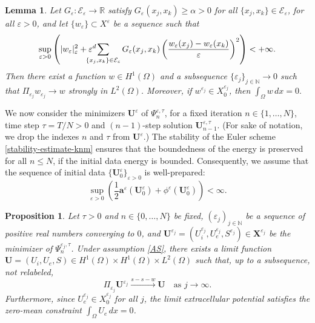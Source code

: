 \documentclass[a4paper,11pt]{article}
\newtheorem{lemma}[theorem]{Lemma}
\newtheorem{proposition}[theorem]{Proposition}
\theoremstyle{definition}
\numberwithin{equation}{section}
\newcommand{\e}{\varepsilon}
\newcommand{\R}{\mathbb{R}}
\begin{document}
\begin{lemma}
	\label{lemma:compactness}
	Let $G_\e:\mathcal E_\e \to \R$ satisfy $G_\e(x_j,x_k)\geq \alpha>0$ for all $\{x_j,x_k\}\in \mathcal E_\e$, for all $\e>0$, and let $\{w_\e\} \subset X^\e $ be a sequence such that
	\begin{equation}
		\label{eq:bounded_H1}
		\sup_{\e>0} \left( |w_\e|_\e^2 + \e^d\hspace{-0.5cm}\sum_{\{x_j,x_k\}\in \mathcal E_\e} G_\e(x_j,x_k) \left(\frac{w_\e(x_j)-w_\e(x_k)}{\e}\right)^2\right) < +\infty.
	\end{equation}
	Then there exist a function $w \in H^1(\Omega)$ and a subsequence $\{\e_j\}_{j \in \mathbb{N}} \to 0$ such that $\Pi_{\e_j} w_{\e_j} \to w$ strongly in $L^2(\Omega)$. Moreover, if $w^{\e_j} \in X_0^{\e_j}$, then
	\(
	\int_\Omega w \, dx = 0.
	\)
\end{lemma}




We now consider the minimizers $\mathbf{U}^\e$ of  $\Psi_n^{\e,\tau}$, for a fixed iteration $n \in \{1, \dots, N\}$, time step $\tau =T/N> 0$ and $(n-1)$-step solution $\mathbf{U}_{n-1}^{\e,\tau}$. (For sake of notation, we drop the indexes $n$ and $\tau$ from $\mathbf{U}^\e$.) 
The stability of the Euler scheme \eqref{stability-estimate-knm} ensures that the boundedness of the energy is preserved for all $n \le N$, if the initial data energy is bounded. Consequently, we assume that the sequence of initial data $\{\mathbf{U}_0^{\e}\}_{\e > 0}$ is well-prepared:
\begin{equation}
	\label{AS}
	\sup_{\e>0} \left( \frac{1}{2} \mathbf{a}^\e\left(\mathbf{U}_0^{\e}\right) + \phi^\e\left(\mathbf{U}_0^{\e}\right) \right) < \infty.
\end{equation}

\begin{proposition}
	\label{proposition:compactness}
	Let $\tau > 0$ and $n \in \{0, \dots, N\}$ be fixed, $(\varepsilon_j)_{j \in \mathbb{N}}$ be a sequence of positive real numbers converging to $0$, and $\mathbf{U}^{\varepsilon_j}=(U_{i}^{\varepsilon_j}, U_{e}^{\varepsilon_j}, S^{\varepsilon_j}) \in \mathbf{X}^{\varepsilon_j}$ be the minimizer of $\Psi_n^{\varepsilon_j,\tau}$. Under assumption \eqref{AS}, there exists a limit function $\mathbf{U}=(U_{i}, U_{e}, S) \in H^1(\Omega) \times H^1(\Omega) \times L^2(\Omega)$ such that, up to a subsequence, not relabeled, 
	\[
	\Pi_{\varepsilon_j} \mathbf{U}^{\varepsilon_j} \xrightarrow{s-s-w} \mathbf U \quad \text{as } j \to \infty.
	\]
	Furthermore, since $U_{e}^{\varepsilon_j} \in X_0^{\varepsilon_j}$ for all $j$, the limit extracellular potential satisfies the zero-mean constraint $\displaystyle\int_\Omega U_{e} \, dx = 0$.
\end{proposition}
\end{document}
